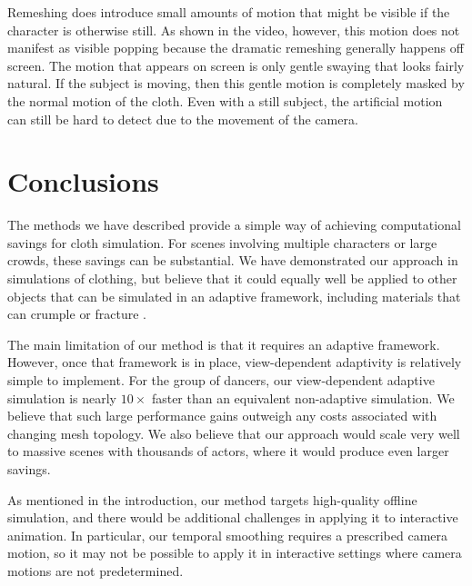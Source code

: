 \documentclass[10pt,journal,compsoc,twoside]{TexInputs/IEEEtran}
\begin{document}

Remeshing does introduce small amounts of motion that might be visible if
the character is otherwise still. As shown in the video, however, this motion
does not manifest as visible popping because the dramatic remeshing generally
happens off screen. The motion that appears on screen is only gentle swaying that
looks fairly natural. If the subject is moving, then this gentle motion is
completely masked by the normal motion of the cloth. Even with a still subject, the
artificial motion can still be hard to detect due to the movement of the camera.


\section{Conclusions}

The methods we have described provide a simple way of achieving computational
savings for cloth simulation. For scenes involving multiple characters or large
crowds, these savings can be substantial. We have demonstrated our approach in
simulations of clothing, but believe that it could equally well be applied to
other objects that can be simulated in an adaptive framework, including
materials that can crumple \cite{Narain:2013:FCA} or
fracture \cite{Pfaff:2014:ATC}.

The main limitation of our method is that it requires an adaptive framework.
However, once that framework is in place, view-dependent adaptivity is
relatively simple to implement. For the group of dancers, our view-dependent adaptive
simulation is nearly $10\times$ faster than an equivalent non-adaptive simulation. We
believe that such large performance gains outweigh any costs associated
with changing mesh topology. We also believe that our approach
would scale very well to massive scenes with thousands of actors, where it would
produce even larger savings.

As mentioned in the introduction, our method targets high-quality offline simulation,
and there would be additional challenges in applying it to interactive animation.
In particular, our temporal smoothing requires a prescribed camera motion, so it may not be possible to apply it in interactive settings 
where camera motions are not predetermined. 
\end{document}

